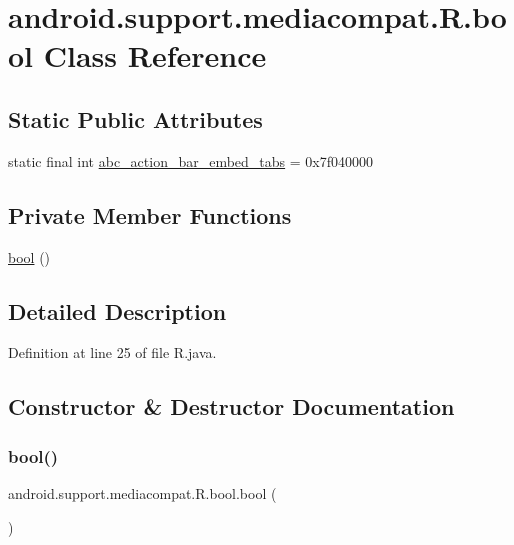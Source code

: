 \hypertarget{classandroid_1_1support_1_1mediacompat_1_1_r_1_1bool}{}\section{android.\+support.\+mediacompat.\+R.\+bool Class Reference}
\label{classandroid_1_1support_1_1mediacompat_1_1_r_1_1bool}
\subsection*{Static Public Attributes}
\begin{DoxyCompactItemize}
\item 
static final int \mbox{\hyperlink{classandroid_1_1support_1_1mediacompat_1_1_r_1_1bool_abb24c449546205df61a1fd3372dcaae9}{abc\+\_\+action\+\_\+bar\+\_\+embed\+\_\+tabs}} = 0x7f040000
\end{DoxyCompactItemize}
\subsection*{Private Member Functions}
\begin{DoxyCompactItemize}
\item 
\mbox{\hyperlink{classandroid_1_1support_1_1mediacompat_1_1_r_1_1bool_a83fb6190332557baffa092b207f94f1a}{bool}} ()
\end{DoxyCompactItemize}


\subsection{Detailed Description}


Definition at line 25 of file R.\+java.



\subsection{Constructor \& Destructor Documentation}
\mbox{\label{classandroid_1_1support_1_1mediacompat_1_1_r_1_1bool_a83fb6190332557baffa092b207f94f1a}} 
\subsubsection{\texorpdfstring{bool()}{bool()}}
{\footnotesize\ttfamily android.\+support.\+mediacompat.\+R.\+bool.\+bool (\begin{DoxyParamCaption}{ }\end{DoxyParamCaption})\hspace{0.3cm}{\ttfamily [private]}}



